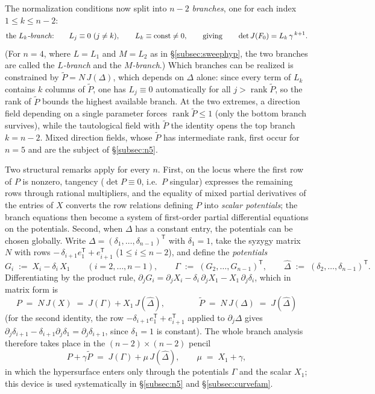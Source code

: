 \documentclass[11pt]{article}
\theoremstyle{plain}
\theoremstyle{definition}
\theoremstyle{remark}
\begin{document}
The normalization conditions now split into $n-2$ \emph{branches}, one for each
index $1\le k\le n-2$:
\[
\text{the \emph{$L_k$-branch}:}\qquad
L_j\equiv0\ (j\neq k),\qquad L_k\equiv\text{const}\neq0,
\qquad\text{giving}\qquad \det J(F_0)=L_k\,\gamma^{\,k+1} .
\]
(For $n=4$, where $L=L_1$ and $M=L_2$ as in \S\ref{subsec:sweephyp}, the two
branches are called the \emph{$L$-branch} and the \emph{$M$-branch}.)
Which branches can be realized is constrained by $\widetilde P=N\,J(\Delta)$,
which depends on $\Delta$ alone: since every term of $L_k$ contains $k$ columns
of $\widetilde P$, one has $L_j\equiv0$ automatically for all
$j>\operatorname{rank}\widetilde P$, so the rank of $\widetilde P$ bounds the
highest available branch. At the two extremes, a direction field depending on a
single parameter forces $\operatorname{rank}\widetilde P\le1$ (only the bottom
branch survives), while the tautological field with $\widetilde P$ the identity
opens the top branch $k=n-2$. Mixed direction fields, whose $\widetilde P$ has
intermediate rank, first occur for $n=5$ and are the subject of
\S\ref{subsec:n5}.

Two structural remarks apply for every $n$. First, on the locus where the first
row of $P$ is nonzero, tangency ($\det P\equiv0$, i.e.\ $P$ singular) expresses
the remaining rows through rational multipliers, and the equality of mixed
partial derivatives of the entries of $X$ converts the row relations defining
$P$ into \emph{scalar potentials}; the branch equations then become a system of
first-order partial differential equations on the potentials. Second, when
$\Delta$ has a constant entry, the potentials can be chosen globally. Write
$\Delta=(\delta_1,\dots,\delta_{n-1})^{\mathsf T}$ with $\delta_1=1$, take the
syzygy matrix $N$ with rows $-\,\delta_{i+1}e_1^{\mathsf T}+e_{i+1}^{\mathsf T}$
($1\le i\le n-2$), and define the \emph{potentials}
\[
G_i\;:=\;X_i-\delta_i\,X_1\qquad(i=2,\dots,n-1),
\qquad
\Gamma\;:=\;(G_2,\dots,G_{n-1})^{\mathsf T},
\qquad
\widehat\Delta\;:=\;(\delta_2,\dots,\delta_{n-1})^{\mathsf T}.
\]
Differentiating by the product rule,
$\partial_jG_i=\partial_jX_i-\delta_i\,\partial_jX_1-X_1\,\partial_j\delta_i$,
which in matrix form is
\[
P\;=\;N\,J(X)\;=\;J(\Gamma)+X_1\,J(\widehat\Delta),
\qquad\qquad
\widetilde P\;=\;N\,J(\Delta)\;=\;J(\widehat\Delta)
\]
(for the second identity, the row $-\delta_{i+1}e_1^{\mathsf T}+e_{i+1}^{\mathsf T}$
applied to $\partial_j\Delta$ gives
$\partial_j\delta_{i+1}-\delta_{i+1}\partial_j\delta_1=\partial_j\delta_{i+1}$,
since $\delta_1=1$ is constant). The whole branch analysis therefore takes
place in the $(n-2)\times(n-2)$ pencil
\[
P+\gamma\widetilde P\;=\;J(\Gamma)+\mu\,J(\widehat\Delta),
\qquad
\mu\;=\;X_1+\gamma ,
\]
in which the hypersurface enters only through the potentials $\Gamma$ and the
scalar $X_1$; this device is used systematically in \S\ref{subsec:n5}
and \S\ref{subsec:curvefam}.
\end{document}
